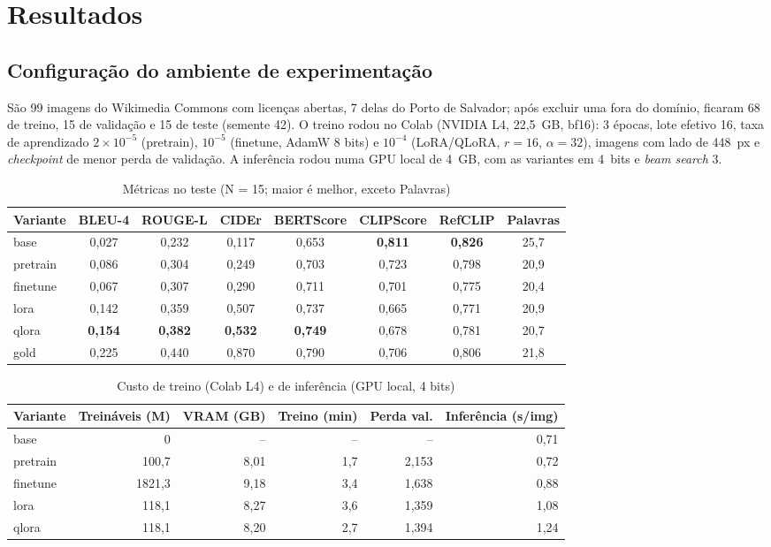 \documentclass[12pt]{article}
\begin{document}
\section{Resultados}

\subsection{Configuração do ambiente de experimentação}

São 99 imagens do Wikimedia Commons com licenças abertas, 7 delas do Porto de
Salvador; após excluir uma fora do domínio, ficaram 68 de treino, 15 de
validação e 15 de teste (semente 42). O treino rodou no Colab (NVIDIA L4,
22,5~GB, bf16): 3 épocas, lote efetivo 16, taxa de aprendizado
$2\times10^{-5}$ (pretrain), $10^{-5}$ (finetune, AdamW 8 bits) e $10^{-4}$
(LoRA/QLoRA, $r=16$, $\alpha=32$), imagens com lado de 448~px e
\textit{checkpoint} de menor perda de validação. A inferência rodou numa GPU
local de 4~GB, com as variantes em 4~bits e \textit{beam search} 3.

\begin{table}[ht]
\centering
\caption{Métricas no teste (N = 15; maior é melhor, exceto Palavras)}
\label{tab:metricas}
\footnotesize
\begin{tabular}{lccccccc}
\toprule
Variante & BLEU-4 & ROUGE-L & CIDEr & BERTScore & CLIPScore & RefCLIP & Palavras \\
\midrule
base     & 0,027 & 0,232 & 0,117 & 0,653 & \textbf{0,811} & \textbf{0,826} & 25,7 \\
pretrain & 0,086 & 0,304 & 0,249 & 0,703 & 0,723 & 0,798 & 20,9 \\
finetune & 0,067 & 0,307 & 0,290 & 0,711 & 0,701 & 0,775 & 20,4 \\
lora     & 0,142 & 0,359 & 0,507 & 0,737 & 0,665 & 0,771 & 20,9 \\
qlora    & \textbf{0,154} & \textbf{0,382} & \textbf{0,532} & \textbf{0,749} & 0,678 & 0,781 & 20,7 \\
\midrule
gold     & 0,225 & 0,440 & 0,870 & 0,790 & 0,706 & 0,806 & 21,8 \\
\bottomrule
\end{tabular}
\end{table}

\begin{table}[ht]
\centering
\caption{Custo de treino (Colab L4) e de inferência (GPU local, 4 bits)}
\label{tab:custo}
\footnotesize
\begin{tabular}{lrrrrr}
\toprule
Variante & Treináveis (M) & VRAM (GB) & Treino (min) & Perda val. & Inferência (s/img) \\
\midrule
base     & 0      & --   & --  & --    & 0,71 \\
pretrain & 100,7  & 8,01 & 1,7 & 2,153 & 0,72 \\
finetune & 1821,3 & 9,18 & 3,4 & 1,638 & 0,88 \\
lora     & 118,1  & 8,27 & 3,6 & 1,359 & 1,08 \\
qlora    & 118,1  & 8,20 & 2,7 & 1,394 & 1,24 \\
\bottomrule
\end{tabular}
\end{table}
\end{document}
